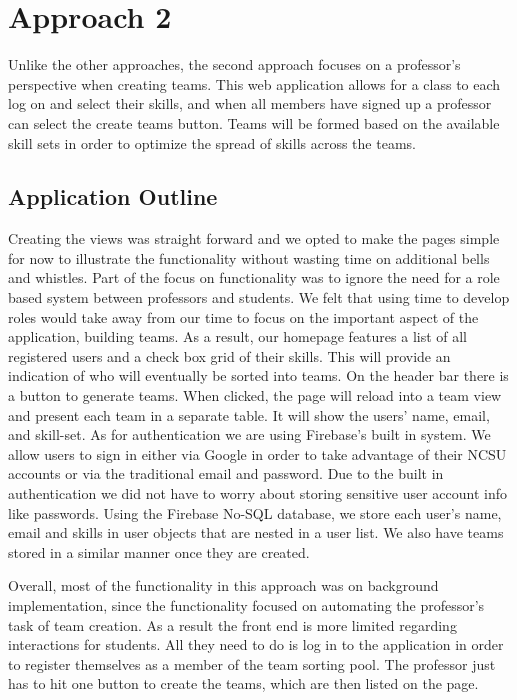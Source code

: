 \documentclass[conference]{IEEEtran}
\begin{document}
\section{Approach 2}
Unlike the other approaches, the second approach focuses on a professor's perspective when creating teams. This web application allows for a class to each log on and select their skills, and when all members have signed up a professor can select the create teams button. Teams will be formed based on the available skill sets in order to optimize the spread of skills across the teams. 

\subsection{Application Outline}
Creating the views was straight forward and we opted to make the pages simple for now to illustrate the functionality without wasting time on additional bells and whistles. Part of the focus on functionality was to ignore the need for a role based system between professors and students. We felt that using time to develop roles would take away from our time to focus on the important aspect of the application, building teams. As a result, our homepage features a list of all registered users and a check box grid of their skills. This will provide an indication of who will eventually be sorted into teams. On the header bar there is a button to generate teams. When clicked, the page will reload into a team view and present each team in a separate table. It will show the users' name, email, and skill-set. As for authentication we are using Firebase's built in system. We allow users to sign in either via Google in order to take advantage of their NCSU accounts or via the traditional email and password. Due to the built in authentication we did not have to worry about storing sensitive user account info like passwords. Using the Firebase No-SQL database, we store each user's name, email and skills in user objects that are nested in a user list. We also have teams stored in a similar manner once they are created. 

Overall, most of the functionality in this approach was on background implementation, since the functionality focused on automating the professor's task of team creation. As a result the front end is more limited regarding interactions for students. All they need to do is log in to the application in order to register themselves as a member of the team sorting pool. The professor just has to hit one button to create the teams, which are then listed on the page.
\end{document}
